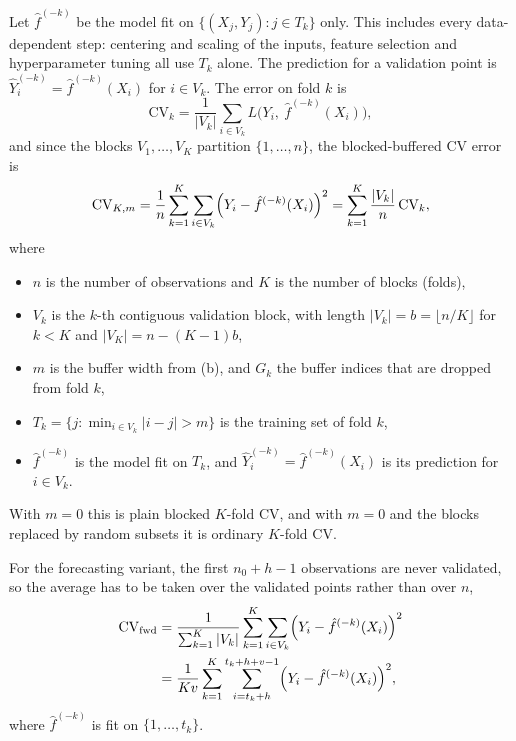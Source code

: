 \documentclass[12pt,letterpaper, onecolumn]{exam}
\begin{document}
\begin{questions}
\begin{solution}
\begin{enumerate}[(a)]
            Let $\hat f^{(-k)}$ be the model fit on $\{(X_j,Y_j): j\in T_k\}$ only. This includes every data-dependent step: centering and scaling of the inputs, feature selection and hyperparameter tuning all use $T_k$ alone. The prediction for a validation point is $\hat Y_i^{(-k)} = \hat f^{(-k)}(X_i)$ for $i\in V_k$. The error on fold $k$ is
            \begin{equation*}
                \text{CV}_k = \frac{1}{|V_k|}\sum_{i\in V_k} L\bigl(Y_i,\ \hat f^{(-k)}(X_i)\bigr),
            \end{equation*}
            and since the blocks $V_1,\dots,V_K$ partition $\{1,\dots,n\}$, the blocked-buffered CV error is
            \begin{equation*}
                \text{CV}_{K,m} = \frac{1}{n}\sum_{k=1}^{K}\sum_{i\in V_k}\Bigl(Y_i-\hat f^{(-k)}(X_i)\Bigr)^2 = \sum_{k=1}^{K}\frac{|V_k|}{n}\,\text{CV}_k,
            \end{equation*}
            where
            \begin{itemize}
                \item $n$ is the number of observations and $K$ is the number of blocks (folds),
                \item $V_k$ is the $k$-th contiguous validation block, with length $|V_k| = b = \lfloor n/K\rfloor$ for $k<K$ and $|V_K| = n-(K-1)b$,
                \item $m$ is the buffer width from (b), and $G_k$ the buffer indices that are dropped from fold $k$,
                \item $T_k = \{j : \min_{i\in V_k}|i-j|>m\}$ is the training set of fold $k$,
                \item $\hat f^{(-k)}$ is the model fit on $T_k$, and $\hat Y_i^{(-k)} = \hat f^{(-k)}(X_i)$ is its prediction for $i\in V_k$.
            \end{itemize}
            With $m=0$ this is plain blocked $K$-fold CV, and with $m=0$ and the blocks replaced by random subsets it is ordinary $K$-fold CV.

            For the forecasting variant, the first $n_0+h-1$ observations are never validated, so the average has to be taken over the validated points rather than over $n$,
            \begin{align*}
                \text{CV}_{\text{fwd}} &= \frac{1}{\sum_{k=1}^{K}|V_k|}\sum_{k=1}^{K}\sum_{i\in V_k}\Bigl(Y_i-\hat f^{(-k)}(X_i)\Bigr)^2\\
                &= \frac{1}{Kv}\sum_{k=1}^{K}\sum_{i=t_k+h}^{t_k+h+v-1}\Bigl(Y_i-\hat f^{(-k)}(X_i)\Bigr)^2,
            \end{align*}
            where $\hat f^{(-k)}$ is fit on $\{1,\dots,t_k\}$.


\end{enumerate}
\end{solution}
\end{questions}
\end{document}
